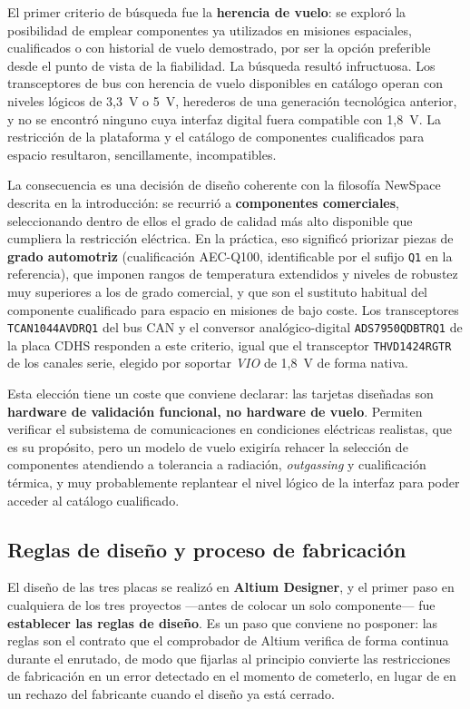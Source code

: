 El primer criterio de búsqueda fue la \textbf{herencia de vuelo}: se exploró la posibilidad de
emplear componentes ya utilizados en misiones espaciales, cualificados o con historial de vuelo
demostrado, por ser la opción preferible desde el punto de vista de la fiabilidad. La búsqueda
resultó infructuosa. Los transceptores de bus con herencia de vuelo disponibles en catálogo operan
con niveles lógicos de 3,3~V o 5~V, herederos de una generación tecnológica anterior, y no se
encontró ninguno cuya interfaz digital fuera compatible con 1,8~V. La restricción de la plataforma
y el catálogo de componentes cualificados para espacio resultaron, sencillamente, incompatibles.

La consecuencia es una decisión de diseño coherente con la filosofía NewSpace descrita en la
introducción: se recurrió a \textbf{componentes comerciales}, seleccionando dentro de ellos el
grado de calidad más alto disponible que cumpliera la restricción eléctrica. En la práctica, eso
significó priorizar piezas de \textbf{grado automotriz} (cualificación AEC-Q100, identificable por
el sufijo \texttt{Q1} en la referencia), que imponen rangos de temperatura extendidos y niveles de
robustez muy superiores a los de grado comercial, y que son el sustituto habitual del componente
cualificado para espacio en misiones de bajo coste. Los transceptores \texttt{TCAN1044AVDRQ1} del
bus CAN y el conversor analógico-digital \texttt{ADS7950QDBTRQ1} de la placa CDHS responden a este
criterio, igual que el transceptor \texttt{THVD1424RGTR} de los canales serie, elegido por soportar
\textit{VIO} de 1,8~V de forma nativa.

Esta elección tiene un coste que conviene declarar: las tarjetas diseñadas son \textbf{hardware de
validación funcional, no hardware de vuelo}. Permiten verificar el subsistema de comunicaciones en
condiciones eléctricas realistas, que es su propósito, pero un modelo de vuelo exigiría rehacer la
selección de componentes atendiendo a tolerancia a radiación, \textit{outgassing} y cualificación
térmica, y muy probablemente replantear el nivel lógico de la interfaz para poder acceder al
catálogo cualificado.

\subsection{Reglas de diseño y proceso de fabricación} \label{sec:reglas_diseno}

El diseño de las tres placas se realizó en \textbf{Altium Designer}, y el primer paso en cualquiera
de los tres proyectos ---antes de colocar un solo componente--- fue \textbf{establecer las reglas de
diseño}. Es un paso que conviene no posponer: las reglas son el contrato que el comprobador de
Altium verifica de forma continua durante el enrutado, de modo que fijarlas al principio convierte
las restricciones de fabricación en un error detectado en el momento de cometerlo, en lugar de en un
rechazo del fabricante cuando el diseño ya está cerrado.

